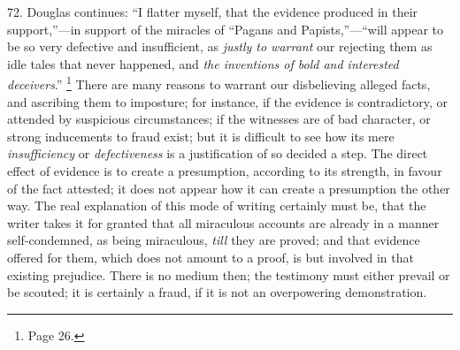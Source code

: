 72.
Douglas continues: ``I flatter myself, that the evidence produced in
their support,''—in support of the miracles of ``Pagans and Papists,''—``will
appear to be so very defective and insufficient, as \emph{justly to
warrant} our rejecting them as idle tales that never happened, and \emph{the
inventions of bold and interested deceivers}.'' \footnote{Page 26.} There are many reasons to warrant our disbelieving alleged
facts, and ascribing them to imposture; for instance, if the evidence
is contradictory, or attended by suspicious circumstances; if the
witnesses are of bad character, or strong inducements to fraud exist;
but it is difficult to see how its mere \emph{insufficiency} or \emph{defectiveness}
is a justification of so decided a step. The direct effect of evidence
is to create a presumption, according to its strength, in favour of
the fact attested; it does not appear how it can create a presumption
the other way. The real explanation of this mode of writing certainly
must be, that the writer takes it for granted that all miraculous
accounts are already in a manner self-condemned, as being miraculous, \emph{till}
they are proved; and that evidence offered for them, which does not
amount to a proof, is but involved in that existing prejudice. There
is no medium then; the testimony must either prevail or be scouted; it
is certainly a fraud, if it is not an overpowering demonstration.

